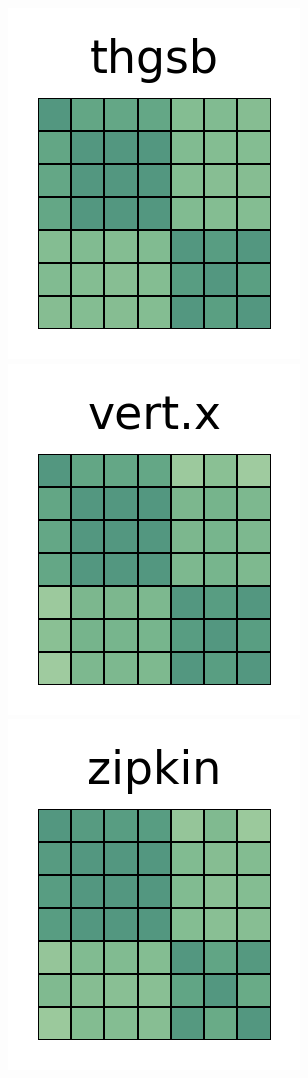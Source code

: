 \documentclass[10pt,conference]{IEEEtran}
\begin{document}
\begin{figure}[htb!]
 \includegraphics[width=\heatmapWidth, keepaspectratio]{correlations-classic/thingsboard-grids.png}
 \includegraphics[width=\heatmapWidth, keepaspectratio]{correlations-classic/vert.x-grids.png}
 \includegraphics[width=\heatmapWidth, keepaspectratio]{correlations-classic/zipkin-grids.png}

\end{figure}
\end{document}
